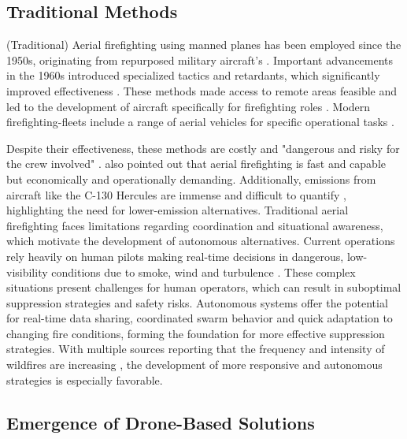 \documentclass[twoside]{article}
\begin{document}
\subsection{Traditional Methods}

(Traditional) Aerial firefighting using manned planes has been employed since the 1950s, originating from repurposed military aircraft's \citep{janney2012airtankers}. Important advancements in the 1960s introduced specialized tactics and retardants, which significantly improved effectiveness \citep{struminskaFlightPerformanceAnalysis2024}.
These methods made access to remote areas feasible and led to the development of aircraft specifically for firefighting roles \citep{struminskaFlightPerformanceAnalysis2024,LockheedSuperHercules}. Modern firefighting-fleets include a range of aerial vehicles for specific operational tasks \citep{FleetInformationFirefighting}. 

Despite their effectiveness, these methods are costly and "dangerous and risky for the crew involved" \citep[p. 1896]{struminskaFlightPerformanceAnalysis2024}. \citet{struminskaFlightPerformanceAnalysis2024} also pointed out that aerial firefighting is fast and capable but economically and operationally demanding. Additionally, emissions from aircraft like the C-130 Hercules are immense and difficult to quantify \citep{LockheedC130Hercules2022,spicerRapidMeasurementEmissions2009}, highlighting the need for lower-emission alternatives.
Traditional aerial firefighting faces limitations regarding coordination and situational awareness, which motivate the development of autonomous alternatives. Current operations rely heavily on human pilots making real-time decisions in dangerous, low-visibility conditions due to smoke, wind and turbulence \citep{struminskaFlightPerformanceAnalysis2024}. These complex situations present challenges for human operators, which can result in suboptimal suppression strategies and safety risks. Autonomous systems offer the potential for real-time data sharing, coordinated swarm behavior and quick adaptation to changing fire conditions, forming the foundation for more effective suppression strategies. With multiple sources reporting that the frequency and intensity of wildfires are increasing \citep{copernicus-wildfires,IPCC2023,grassland_Wildfires}, the development of more responsive and autonomous strategies is especially favorable.

\subsection{Emergence of Drone-Based Solutions}
\end{document}
